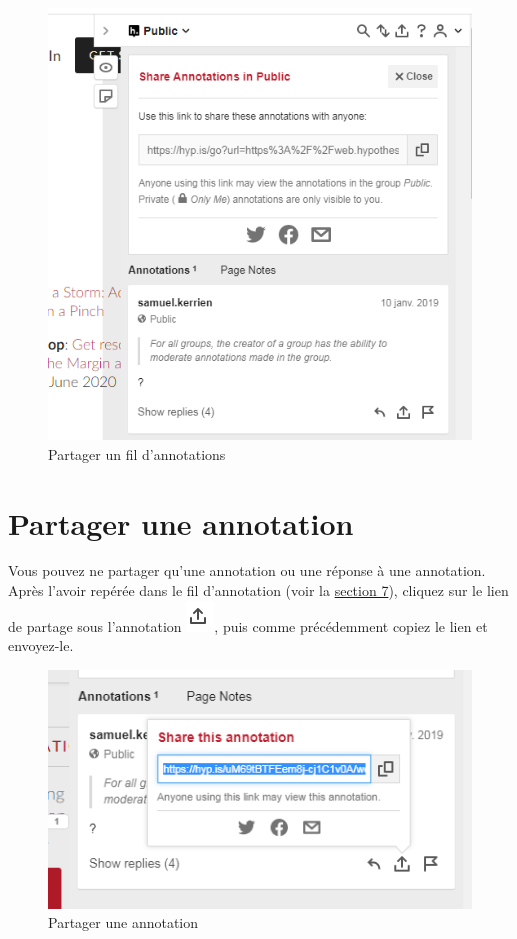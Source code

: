 \documentclass[
]{book}
\begin{document}
\begin{figure}
\centering
\includegraphics{img/cdbebac10f9bd02f38ed117c1ab8e322.png}
\caption{Partager un fil d'annotations}
\end{figure}

\hypertarget{s42}{%
\section{Partager une annotation}\label{s42}}

Vous pouvez ne partager qu'une annotation ou une réponse à une annotation. Après l'avoir repérée dans le fil d'annotation (voir la \protect\hyperlink{s7}{section 7}), cliquez sur le lien de partage sous l'annotation \includegraphics{img/9ed8e6410bcd25e02923bf774a7fb2fe.png}, puis comme précédemment copiez le lien et envoyez-le.

\begin{figure}
\centering
\includegraphics{img/cb6bdc80ca52dfbde7f2cb85ae981643.png}
\caption{Partager une annotation}
\end{figure}
\end{document}
